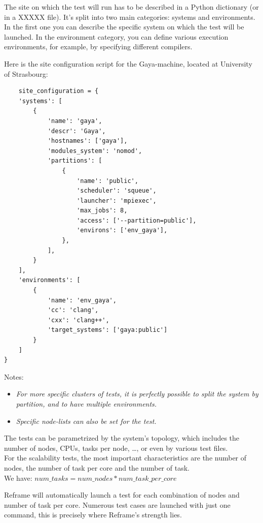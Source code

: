 \documentclass[12pt]{article}
\begin{document}
The site on which the test will run has to be described in a Python dictionary (or in a XXXXX file).
It's split into two main categories: systems and environments. \\
In the first one you can describe the specific system on which the test will be launched.
In the environment category, you can define various execution environments, for example, by specifying different compilers.

Here is the site configuration script for the Gaya-machine, located at University of Strasbourg:
\begin{small}
\begin{verbatim}
    site_configuration = {
    'systems': [
        {
            'name': 'gaya',
            'descr': 'Gaya',
            'hostnames': ['gaya'],
            'modules_system': 'nomod',
            'partitions': [
                {
                    'name': 'public',
                    'scheduler': 'squeue',
                    'launcher': 'mpiexec',
                    'max_jobs': 8,
                    'access': ['--partition=public'],
                    'environs': ['env_gaya'],
                },
            ],
        }
    ],
    'environments': [
        {
            'name': 'env_gaya',
            'cc': 'clang',
            'cxx': 'clang++',
            'target_systems': ['gaya:public']
        }
    ]
}
\end{verbatim}
\end{small}

Notes:
\begin{itemize}[left=2cm]
    \item \textit{For more specific clusters of tests, it is perfectly possible to split the system by partition, and to have multiple environments.}
    \item \textit{Specific node-lists can also be set for the test.}
\end{itemize}

The tests can be parametrized by the system's topology, which includes the number of nodes, CPUs, tasks per node, \ldots, or even by various test files. \\
For the scalability tests, the most important characteristics are the number of nodes, the number of task per core and the number of task.\\
We have: $num\_tasks = num\_nodes * num\_task\_per\_core$

Reframe will automatically launch a test for each combination of nodes and number of task per core.
Numerous test cases are launched with just one command, this is precisely where Reframe's strength lies.
\end{document}
